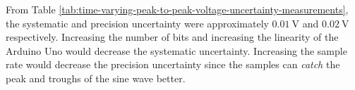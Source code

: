 From Table \ref{tab:time-varying-peak-to-peak-voltage-uncertainty-measurements}, the systematic and precision uncertainty were approximately
$\qty{0.01}{\volt}$ and $\qty{0.02}{\volt}$ respectively. Increasing the number of bits and increasing the linearity of the Arduino Uno would decrease the systematic uncertainty.
Increasing the sample rate would decrease the precision uncertainty since the samples can \textit{catch} the peak and troughs of the sine wave better.









        